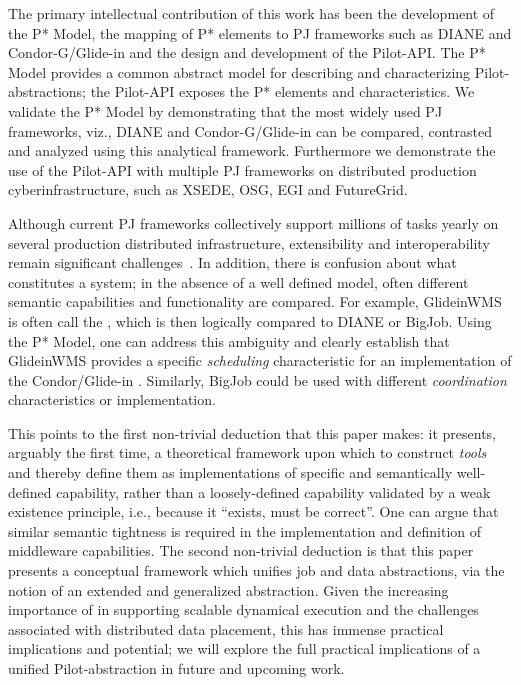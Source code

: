 \documentclass[conference]{IEEEtran}
\begin{document}

The primary intellectual contribution of this work has been the
development of the P* Model, the mapping of P* elements to PJ
frameworks such as DIANE and Condor-G/Glide-in and the design and
development of the Pilot-API.  The P* Model provides a common abstract
model for describing and characterizing Pilot-abstractions; the
Pilot-API exposes the P* elements and characteristics.  We validate
the P* Model by demonstrating that the most widely used PJ frameworks,
viz., DIANE and Condor-G/Glide-in can be compared, contrasted and
analyzed using this analytical framework.  Furthermore we demonstrate
the use of the Pilot-API with multiple PJ frameworks on distributed
production cyberinfrastructure, such as XSEDE, OSG, EGI and
FutureGrid.

Although current PJ frameworks collectively support millions of tasks
yearly on several production distributed infrastructure, extensibility
and interoperability remain significant challenges~\cite{extenci}. In
addition, there is confusion about what constitutes a \pilotjob
system; in the absence of a well defined model, often different
semantic capabilities and functionality are compared. For example, 
GlideinWMS is often call the \pilotjob, which is then logically
compared to DIANE or BigJob. Using the P* Model, one can address this
ambiguity and clearly establish that GlideinWMS provides a specific
{\it scheduling} characteristic for an implementation of the
Condor/Glide-in \pilotjob. Similarly, BigJob could be used with
different {\it coordination} characteristics or implementation.

This points to the first non-trivial deduction that this paper makes:
it presents, arguably the first time, a theoretical framework upon
which to construct {\it tools} and thereby define them as
implementations of specific and semantically well-defined capability,
rather than a loosely-defined capability validated by a weak existence
principle, i.e., because it ``exists, must be correct''. One can argue
that similar semantic tightness is required in the implementation and
definition of middleware capabilities.  The second non-trivial
deduction is that this paper presents a conceptual framework which
unifies job and data abstractions, via the notion of an extended and
generalized \pilot abstraction.  Given the increasing importance of
\pilotjobs in supporting scalable dynamical execution and the
challenges associated with distributed data placement, this
has immense practical implications and potential; we will explore the
full practical implications of a unified Pilot-abstraction in future
and upcoming work.
\end{document}
